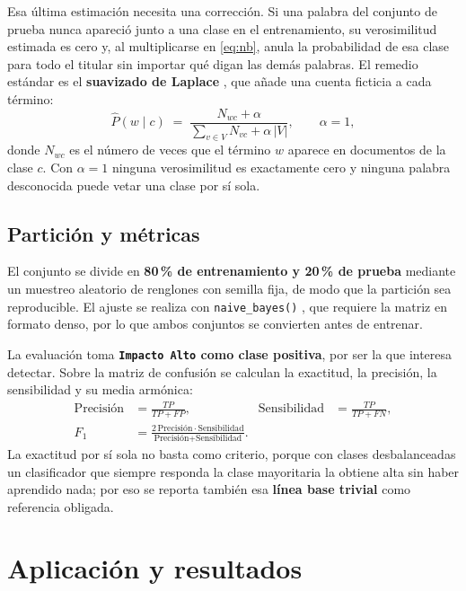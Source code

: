 \documentclass[11pt, a4paper]{article}
\begin{document}
Esa última estimación necesita una corrección. Si una palabra del conjunto de prueba nunca apareció
junto a una clase en el entrenamiento, su verosimilitud estimada es cero y, al multiplicarse en
\eqref{eq:nb}, anula la probabilidad de esa clase para todo el titular sin importar qué digan las
demás palabras. El remedio estándar es el \textbf{suavizado de Laplace} \cite{manning2008}, que
añade una cuenta ficticia a cada término:
\begin{equation}
    \hat{P}(w \mid c) \;=\; \frac{N_{wc} + \alpha}{\displaystyle\sum_{v \in V} N_{vc} + \alpha\,|V|},
    \qquad \alpha = 1,
    \label{eq:laplace}
\end{equation}
donde $N_{wc}$ es el número de veces que el término $w$ aparece en documentos de la clase $c$. Con
$\alpha = 1$ ninguna verosimilitud es exactamente cero y ninguna palabra desconocida puede vetar
una clase por sí sola.

\subsection{Partición y métricas}

El conjunto se divide en \textbf{80\,\% de entrenamiento y 20\,\% de prueba} mediante un muestreo
aleatorio de renglones con semilla fija, de modo que la partición sea reproducible. El ajuste se
realiza con \texttt{naive\_bayes()} \cite{majka2019}, que requiere la matriz en formato denso, por
lo que ambos conjuntos se convierten antes de entrenar.

La evaluación toma \textbf{\texttt{Impacto Alto} como clase positiva}, por ser la que interesa
detectar. Sobre la matriz de confusión se calculan la exactitud, la precisión, la sensibilidad y su
media armónica:
\begin{align}
    \text{Precisión} &= \frac{TP}{TP+FP}, &
    \text{Sensibilidad} &= \frac{TP}{TP+FN}, \label{eq:pr}\\[0.2em]
    F_1 &= \frac{2\,\text{Precisión}\cdot\text{Sensibilidad}}
                {\text{Precisión}+\text{Sensibilidad}}. & & \label{eq:f1}
\end{align}
La exactitud por sí sola no basta como criterio, porque con clases desbalanceadas un clasificador
que siempre responda la clase mayoritaria la obtiene alta sin haber aprendido nada; por eso se
reporta también esa \textbf{línea base trivial} como referencia obligada.

\section{Aplicación y resultados}
\end{document}
